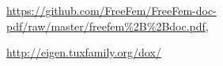 \documentclass[a4paper, 11pt]{article}
\begin{document}
\newpage

\begin{thebibliography}{9}


  \url{https://github.com/FreeFem/FreeFem-doc-pdf/raw/master/freefem\%2B\%2Bdoc.pdf},

  \url{http://eigen.tuxfamily.org/dox/}
\end{thebibliography}
\end{document}
